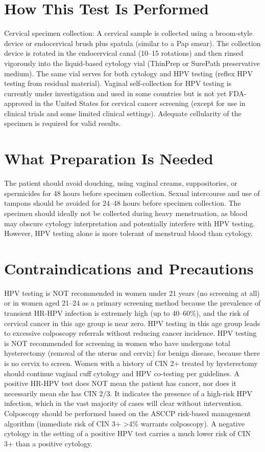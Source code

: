 \section*{How This Test Is Performed}
Cervical specimen collection: A cervical sample is collected using a broom-style device or endocervical brush plus spatula (similar to a Pap smear). The collection device is rotated in the endocervical canal (10--15 rotations) and then rinsed vigorously into the liquid-based cytology vial (ThinPrep or SurePath preservative medium). The same vial serves for both cytology and HPV testing (reflex HPV testing from residual material). Vaginal self-collection for HPV testing is currently under investigation and used in some countries but is not yet FDA-approved in the United States for cervical cancer screening (except for use in clinical trials and some limited clinical settings). Adequate cellularity of the specimen is required for valid results.

\section*{What Preparation Is Needed}
The patient should avoid douching, using vaginal creams, suppositories, or spermicides for 48 hours before specimen collection. Sexual intercourse and use of tampons should be avoided for 24--48 hours before specimen collection. The specimen should ideally not be collected during heavy menstruation, as blood may obscure cytology interpretation and potentially interfere with HPV testing. However, HPV testing alone is more tolerant of menstrual blood than cytology.

\section*{Contraindications and Precautions}
HPV testing is NOT recommended in women under 21 years (no screening at all) or in women aged 21--24 as a primary screening method because the prevalence of transient HR-HPV infection is extremely high (up to 40--60\%), and the risk of cervical cancer in this age group is near zero. HPV testing in this age group leads to excessive colposcopy referrals without reducing cancer incidence. HPV testing is NOT recommended for screening in women who have undergone total hysterectomy (removal of the uterus and cervix) for benign disease, because there is no cervix to screen. Women with a history of CIN 2+ treated by hysterectomy should continue vaginal cuff cytology and HPV co-testing per guidelines. A positive HR-HPV test does NOT mean the patient has cancer, nor does it necessarily mean she has CIN 2/3. It indicates the presence of a high-risk HPV infection, which in the vast majority of cases will clear without intervention. Colposcopy should be performed based on the ASCCP risk-based management algorithm (immediate risk of CIN 3+ >4\% warrants colposcopy). A negative cytology in the setting of a positive HPV test carries a much lower risk of CIN 3+ than a positive cytology.

